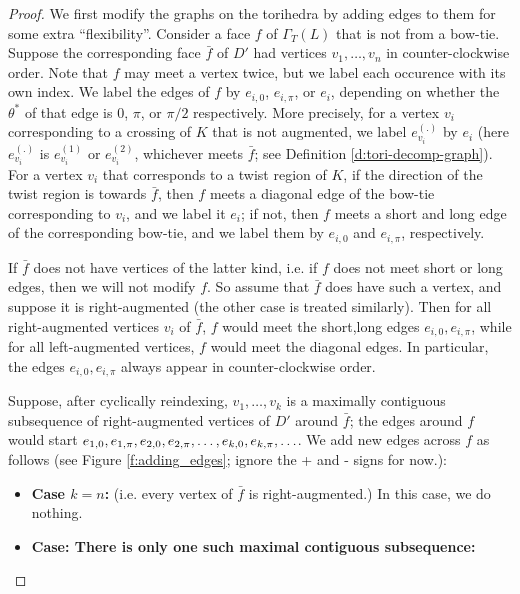 \documentclass[11pt]{amsart}
\newcommand{\defref}[1]{Definition \ref{#1}}
\newcommand{\figref}[1]{Figure \ref{#1}}
\theoremstyle{plain}
\theoremstyle{definition}
\newcommand{\cm}{,\linebreak[1]}
\begin{document}
\begin{proof}
We first modify the graphs on the torihedra by adding edges
to them for some extra ``flexibility''.
Consider a face $f$ of $\Gamma_T(L)$ that is not from a bow-tie.
Suppose the corresponding face $\bar{f}$ of $D'$
had vertices $v_1,\ldots,v_n$ in counter-clockwise order.
Note that $f$ may meet a vertex twice,
but we label each occurence with its own index.
We label the edges of $f$ by $e_{i,0}$, $e_{i,\pi}$, or $e_i$,
depending on whether the $\theta^*$ of that edge
is $0$, $\pi$, or $\pi/2$ respectively.
More precisely, for a vertex $v_i$ corresponding to a crossing
of $K$ that is not augmented,
we label $e_{v_i}^{(.)}$ by $e_i$
(here $e_{v_i}^{(.)}$ is $e_{v_i}^{(1)}$ or $e_{v_i}^{(2)}$,
whichever meets $\bar{f}$; see \defref{d:tori-decomp-graph}).
For a vertex $v_i$ that corresponds to a twist region of $K$,
if the direction of the twist region is towards $\bar{f}$,
then $f$ meets a diagonal edge of the bow-tie corresponding to $v_i$,
and we label it $e_i$;
if not, then $f$ meets a short and long edge of the corresponding bow-tie,
and we label them by $e_{i,0}$ and $e_{i,\pi}$,
respectively.


If $\bar{f}$ does not have vertices of the latter kind,
i.e. if $f$ does not meet short or long edges,
then we will not modify $f$.
So assume that $\bar{f}$ does have such a vertex,
and suppose it is right-augmented
(the other case is treated similarly).
Then for all right-augmented vertices $v_i$ of $\bar{f}$,
$f$ would meet the short,long edges $e_{i,0},e_{i,\pi}$,
while for all left-augmented vertices,
$f$ would meet the diagonal edges.
In particular,
the edges $e_{i,0}, e_{i,\pi}$ always appear in counter-clockwise order.


Suppose, after cyclically reindexing, $v_1,\ldots,v_k$
is a maximally contiguous subsequence of right-augmented vertices
of $D'$ around $\bar{f}$;
the edges around $f$ would start
$e_{1,0} \cm e_{1,\pi} \cm e_{2,0} \cm e_{2,\pi} \cm \ldots
	\cm e_{k,0} \cm e_{k,\pi} \cm \ldots$.
We add new edges across $f$ as follows
(see \figref{f:adding_edges};
ignore the + and - signs for now.):


\begin{itemize}
\item \textbf{Case $k=n$:} (i.e. every vertex of $\bar{f}$ is right-augmented.)
In this case, we do nothing.

\item \textbf{Case: There is only one such maximal contiguous subsequence:}



\end{itemize}
\end{proof}
\end{document}
